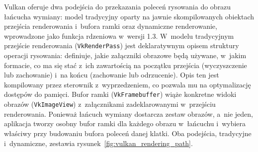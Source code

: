 Vulkan oferuje dwa podejścia do przekazania poleceń rysowania do obrazu łańcucha wymiany:
model tradycyjny oparty na jawnie skompilowanych obiektach przejścia renderowania i~bufora ramki
oraz dynamiczne renderowanie, wprowadzone jako funkcja rdzeniowa w~wersji 1.3.
W~modelu tradycyjnym przejście renderowania (\texttt{VkRenderPass}) jest deklaratywnym opisem struktury operacji
rysowania: definiuje, jakie załączniki obrazowe będą używane, w~jakim formacie, co ma się
stać z~ich zawartością na początku przejścia (wyczyszczenie lub zachowanie) i~na końcu
(zachowanie lub odrzucenie). Opis ten jest kompilowany przez sterownik z~wyprzedzeniem,
co pozwala mu na optymalizację dostępów do pamięci. Bufor ramki (\texttt{VkFramebuffer})
wiąże konkretne widoki obrazów (\texttt{VkImageView}) z~załącznikami zadeklarowanymi
w~przejściu renderowania. Ponieważ łańcuch wymiany dostarcza zestaw obrazów, a~nie jeden,
aplikacja tworzy osobny bufor ramki dla każdego obrazu w~łańcuchu i~wybiera właściwy
przy budowaniu bufora poleceń danej klatki.
Oba podejścia, tradycyjne i~dynamiczne, zestawia rysunek~\ref{fig:vulkan_rendering_path}.


